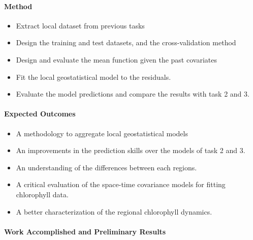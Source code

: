 \paragraph{Method}

\begin{itemize}
\item Extract local dataset from previous tasks
\item Design the training and test datasets, and the cross-validation method
\item Design and evaluate the mean function given the past covariates
\item Fit the local geostatistical model to the residuals.
\item Evaluate the model predictions and compare the results with task 2 and 3.
\end{itemize}

\paragraph{Expected Outcomes}

\begin{itemize}
\item A methodology to aggregate local geostatistical models
\item An improvements in the prediction skills over the models of task 2 and 3.
\item An understanding of the differences between each regions.
\item A critical evaluation of the space-time covariance models for fitting chlorophyll data.
\item A better characterization of the regional chlorophyll dynamics.
\end{itemize}

\paragraph{Work Accomplished and Preliminary Results}

